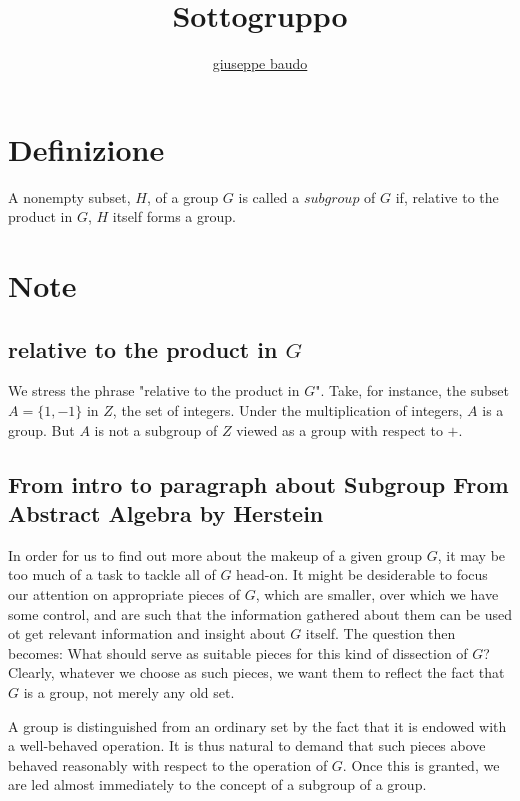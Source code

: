 \documentclass[a4paper,10pt]{article}
\title{Sottogruppo}
\author{\href{http://www.baudo.hol.es}{giuseppe baudo}}
\begin{document}
\maketitle

\section{Definizione}
A nonempty subset, $H$, of a group $G$ is called a $subgroup$ of $G$ if, relative to the product in $G$, $H$ itself forms a group.

\section{Note}
\subsection{relative to the product in $G$}
We stress the phrase "relative to the product in $G$". Take, for instance, the subset $A = \{1, -1\}$ in $Z$, the set of integers. Under the multiplication of integers,
$A$ is a group. But $A$ is not a subgroup of $Z$ viewed as a group with respect to $+$.

\subsection{From intro to paragraph about Subgroup From Abstract Algebra by Herstein}
In order for us to find out more about the makeup of a given group $G$, it may be too much of a task to tackle all of $G$ head-on. It might be desiderable to focus our
attention on appropriate pieces of $G$, which are smaller, over which we have some control, and are such that the information gathered about them can be used ot get 
relevant information and insight about $G$ itself. The question then becomes: What should serve as suitable pieces for this kind of dissection of $G$? Clearly, whatever
we choose as such pieces, we want them to reflect the fact that $G$ is a group, not merely any old set.

A group is distinguished from an ordinary set by the fact that it is endowed with a well-behaved operation. It is thus natural to demand that such pieces above behaved
reasonably with respect to the operation of $G$. Once this is granted, we are led almost immediately to the concept of a subgroup of a group.
\end{document}
